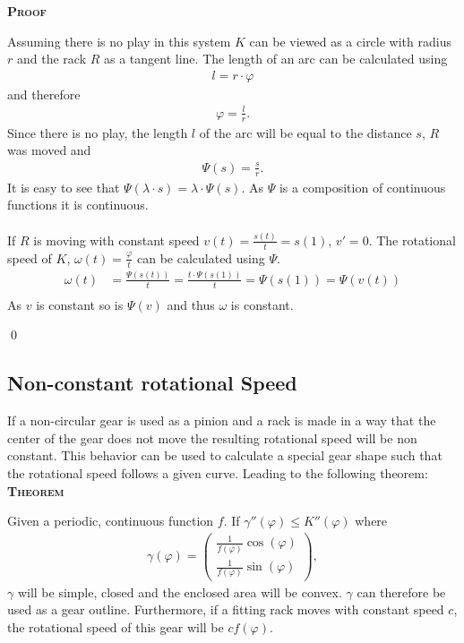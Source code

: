 \documentclass[12pt,a4paper]{scrartcl}
\numberwithin{equation}{section}
\numberwithin{myalgctr}{section}
\newcounter{mytheoremctr}
\newenvironment{mytheorem}{%
	\bigskip\noindent%
	\refstepcounter{mytheoremctr}%
	\textsc{\textbf{Theorem} \themytheoremctr}%
	\newline
}{\par\bigskip}  %
\numberwithin{mytheoremctr}{section}
\newenvironment{myproof}{%
	\bigskip\noindent%
	\textsc{\textbf{Proof}}%
	\indent
}{\qed\par\bigskip}  %
\numberwithin{myexamplectr}{subsection}
\begin{document}
	\begin{myproof}
		Assuming there is no play in this system $K$ can be viewed as a circle with radius $r$ and the rack $R$ as a tangent line. The length of an arc can be calculated using
		\begin{align*}
			l=r\cdot \varphi
		\end{align*}
		and therefore
		\begin{align*}
			\varphi=\frac{l}{r}.
		\end{align*}
		Since there is no play, the length $l$ of the arc will be equal to the distance $s$, $R$ was moved and 
		\begin{align*}
			\Psi(s) = \frac{s}{r}.
		\end{align*}
		It is easy to see that $\Psi(\lambda\cdot s) = \lambda\cdot\Psi(s)$. As $\Psi$ is a composition of continuous functions it is continuous. \\
		\\
		If $R$ is moving with constant speed $v(t)=\frac{s(t)}{t}=s(1)$, $v'=0$. The rotational speed of $K$, $\omega(t)=\frac{\varphi}{t}$ can be calculated using $\Psi$.
		\begin{align*}
			\omega(t)&= \frac{\Psi(s(t))}{t} = \frac{t\cdot\Psi(s(1))}{t} = \Psi(s(1)) = \Psi(v(t))\\
		\end{align*}
		As $v$ is constant so is $\Psi(v)$ and thus $\omega$ is constant.
		
	\end{myproof}
	
	\subsection{Non-constant rotational Speed}
	If a non-circular gear is used as a pinion and a rack is made in a way that the center of the gear does not move the resulting rotational speed will be non constant. This behavior can be used to calculate a special gear shape such that the rotational speed follows a given curve. Leading to the following theorem:\\
	
	\begin{mytheorem}
		Given a periodic, continuous function $f$. If $\gamma''(\varphi)\leq K''(\varphi)$ where
		\begin{align}
			\gamma(\varphi)= 
			\begin{pmatrix}
				\frac{1}{f(\varphi)}\cos(\varphi)\\
				\frac{1}{f(\varphi)}\sin(\varphi)
			\end{pmatrix},
		\end{align}
		$\gamma$ will be simple, closed and the enclosed area will be convex. $\gamma$ can therefore be used as a gear outline. Furthermore, if a fitting rack moves with constant speed $c$, the rotational speed of this gear will be $cf(\varphi)$.
	\end{mytheorem}
\end{document}
